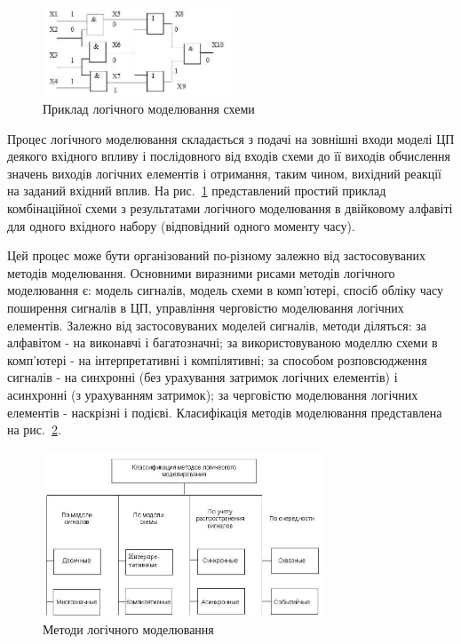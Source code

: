 \documentclass[12pt,a4paper]{article}
\begin{document}
\begin{figure}[h]
  \centering
    \includegraphics[width=0.5\textwidth]{03_02.jpg}
  \caption{Приклад логічного моделювання схеми\label{logicModEx}}
\end{figure}

Процес логічного моделювання складається з подачі на зовнішні входи моделі ЦП деякого вхідного впливу і послідовного від входів схеми до її виходів обчислення значень виходів логічних елементів і отримання, таким чином, вихідний реакції на заданий вхідний вплив. На рис.~\ref{logicModEx} представлений простий приклад комбінаційної схеми з результатами логічного моделювання в двійковому алфавіті для одного вхідного набору (відповідний одного моменту часу).

Цей процес може бути організований по-різному залежно від застосовуваних методів моделювання. Основними виразними рисами методів логічного моделювання є: модель сигналів, модель схеми в комп'ютері, спосіб обліку часу поширення сигналів в ЦП, управління черговістю моделювання логічних елементів. Залежно від застосовуваних моделей сигналів, методи діляться: за алфавітом - на виконавчі і багатозначні; за використовуваною моделлю схеми в комп'ютері - на інтерпретативні і компілятивні; за способом розповсюдження сигналів - на синхронні (без урахування затримок логічних елементів) і асинхронні (з урахуванням затримок); за черговістю моделювання логічних елементів - наскрізні і подієві. Класифікація методів моделювання представлена ​​на рис.~\ref{logicModMethods}.

\begin{figure}[h]
  \centering
    \includegraphics[width=0.75\textwidth]{03_03.jpg}
  \caption{Методи логічного моделювання\label{logicModMethods}}
\end{figure}
\end{document}
